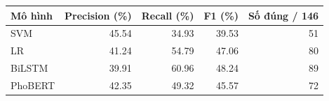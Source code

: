 \begin{tabular}{lrrrr}\toprule
Mô hình & Precision (\%) & Recall (\%) & F1 (\%) & Số đúng / 146\\\midrule
SVM & 45.54 & 34.93 & 39.53 & 51\\
LR & 41.24 & 54.79 & 47.06 & 80\\
BiLSTM & 39.91 & 60.96 & 48.24 & 89\\
PhoBERT & 42.35 & 49.32 & 45.57 & 72\\
\bottomrule\end{tabular}
